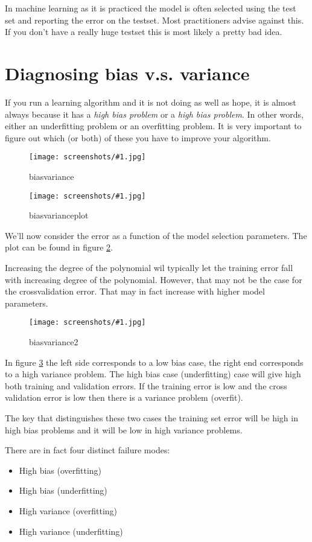 \documentclass[a4, 12pt, english, USenglish]{scrreprt}
\newcommand{\screenshot}[2]{
\begin{figure}[htb]
\texttt{[image: screenshots/\#1.jpg]}
\label{#1}
\caption{#2}
\end{figure}}
\newcommand{\idx}[1]{{\em #1}\index{#1}}
\begin{document}
In machine learning as it is practiced the model is often selected
using the test set and reporting the error on the testset.   Most
practitioners advise against this.  If you don't have a really huge
testset this is most likely a pretty bad idea.

\section{Diagnosing bias v.s. variance}

If you run a learning algorithm and it is not doing as well as hope,
it is almost always because it has a \idx{high bias problem} or a
\idx{high bias problem}. In other words, either an underfitting
problem or an overfitting problem.  It is very important to figure out
which (or both) of these you have to improve your algorithm.

\screenshot{biasvariance}{biasvariance}

\screenshot{biasvarianceplot}{biasvarianceplot}

We'll now consider the error as a function of the model selection
parameters.  The plot can be found in figure \ref{biasvarianceplot}.

Increasing the degree of the polynomial wil typically let the training
error fall with increasing degree of the polynomial.  However, that
may not be the case for the crossvalidation error. That may in fact
increase with higher model parameters.

\screenshot{biasvariance2}{biasvariance2}

In figure \ref{biasvariance2} the left side corresponds to a low bias
case, the right end corresponds to a high variance problem.  The high
bias case (underfitting) case will give high both training and
validation errors.   If the training error is low and the cross
validation error is low then there is a variance problem (overfit).

The key that distinguishes these two cases the training set error
will be high in high bias problems and it will be low in high variance
problems.

There are in fact four distinct failure modes:

\begin{itemize}

\item High bias (overfitting)
\item High bias (underfitting)
\item High variance (overfitting)
\item High variance (underfitting)
\end{itemize}
\end{document}
